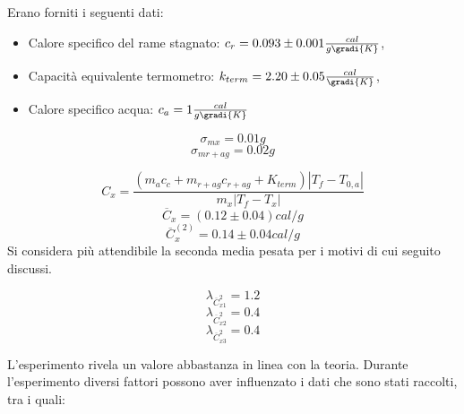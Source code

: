 Erano forniti i seguenti dati:
\begin{itemize}
 \item Calore specifico del rame stagnato: $c_r = 0.093 \pm  0.001 \frac{cal}{g \gradi{K}}$,
 \item Capacità equivalente termometro: $k_{term} = 2.20 \pm 0.05 \frac{cal}{\gradi{K}}$,
 \item Calore specifico acqua: $c_a = 1 \frac{cal}{g \gradi{K}}$
\end{itemize}


\[\sigma _{mx} = 0.01 g \]
\[\sigma_{mr+ag} = 0.02 g \]

\[C_x = \frac{(m_a c_c + m_{r+ag} c_{r+ag} + K_{term}) |T_f - T_{0,a}|}{m_x |T_f - T_x|}\]
\[\overline{C}_x = (0.12 \pm 0.04) cal/g\]
\[\overline{C}_x^{(2)} = 0.14 \pm 0.04 cal/g\]
Si considera più attendibile la seconda media pesata per i motivi di cui seguito discussi.

\[\lambda_{\overline{C}^2_{x1}} = 1.2 \]
\[\lambda_{\overline{C}^2_{x2}} = 0.4 \]
\[\lambda_{\overline{C}^2_{x3}} = 0.4 \]

L'esperimento rivela un valore abbastanza in linea con la teoria. Durante l'esperimento diversi fattori
possono aver influenzato i dati che sono stati raccolti, tra i quali:

